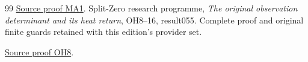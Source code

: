 \documentclass[11pt]{article}
\begin{document}
\begin{thebibliography}{99}
\href{https://github.com/KokunoYumeto/zeta-function-research-reader/blob/main/workbenches/splitzero-tandem/continuations/20260921-kernel-degree-steps/providers/OBSERVATION_COMPLETE_PROOFS.tex\#L1893}{Source proof MA1}.
 Split-Zero research programme,
\emph{The original observation determinant and its heat return},
OH8--16, result055. Complete proof and original finite guards
retained with this edition's provider set.

\href{https://github.com/KokunoYumeto/zeta-function-research-reader/blob/main/workbenches/splitzero-tandem/continuations/20260921-kernel-degree-steps/providers/OBSERVATION_COMPLETE_PROOFS.tex\#L305}{Source proof OH8}.
\end{thebibliography}
\end{document}
